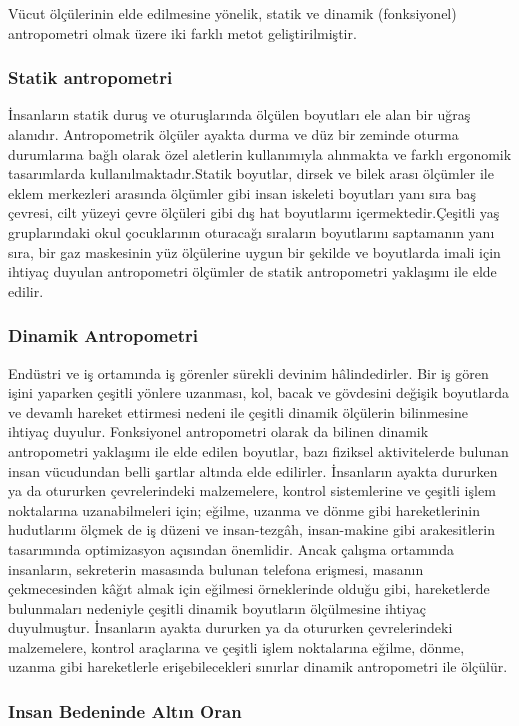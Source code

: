 \documentclass[11pt,a4paper]{report}
\begin{document}
\begin{justify}
 		Vücut ölçülerinin elde edilmesine yönelik, statik ve dinamik (fonksiyonel) antropometri olmak üzere iki farklı metot geliştirilmiştir.
 		
 		\subsubsection{Statik antropometri}İnsanların statik duruş ve oturuşlarında ölçülen boyutları ele alan bir uğraş alanıdır. Antropometrik ölçüler ayakta durma ve düz bir zeminde oturma durumlarına bağlı olarak özel aletlerin kullanımıyla alınmakta ve farklı ergonomik tasarımlarda kullanılmaktadır.Statik boyutlar, dirsek ve bilek arası ölçümler ile eklem merkezleri arasında ölçümler gibi insan iskeleti boyutları yanı sıra baş çevresi, cilt yüzeyi çevre ölçüleri gibi dış hat boyutlarını içermektedir.Çeşitli yaş gruplarındaki okul çocuklarının oturacağı sıraların boyutlarını saptamanın yanı sıra, bir gaz maskesinin yüz ölçülerine uygun bir şekilde ve boyutlarda imali için ihtiyaç duyulan antropometri ölçümler de statik antropometri yaklaşımı ile elde edilir.
 		\subsubsection{Dinamik Antropometri}
 		Endüstri ve iş ortamında iş görenler sürekli devinim hâlindedirler. Bir iş gören işini yaparken çeşitli yönlere uzanması, kol, bacak ve gövdesini değişik boyutlarda ve devamlı hareket ettirmesi nedeni ile çeşitli dinamik ölçülerin bilinmesine ihtiyaç duyulur. Fonksiyonel antropometri olarak da bilinen dinamik antropometri yaklaşımı ile elde edilen boyutlar, bazı fiziksel aktivitelerde bulunan insan vücudundan belli şartlar altında elde edilirler. İnsanların ayakta dururken ya da otururken çevrelerindeki malzemelere, kontrol sistemlerine ve çeşitli işlem noktalarına uzanabilmeleri için; eğilme, uzanma ve dönme gibi hareketlerinin hudutlarını ölçmek de iş düzeni ve insan-tezgâh, insan-makine gibi arakesitlerin tasarımında optimizasyon açısından önemlidir. Ancak çalışma ortamında insanların, sekreterin masasında bulunan telefona erişmesi, masanın çekmecesinden kâğıt almak için eğilmesi örneklerinde olduğu gibi, hareketlerde bulunmaları nedeniyle çeşitli dinamik boyutların ölçülmesine ihtiyaç duyulmuştur. İnsanların ayakta dururken ya da otururken çevrelerindeki malzemelere, kontrol araçlarına ve çeşitli işlem noktalarına eğilme, dönme, uzanma gibi hareketlerle erişebilecekleri sınırlar dinamik antropometri ile ölçülür.
 		
 		
 		\subsubsection{Insan Bedeninde Altın Oran}
 		

\end{justify}
\end{document}
